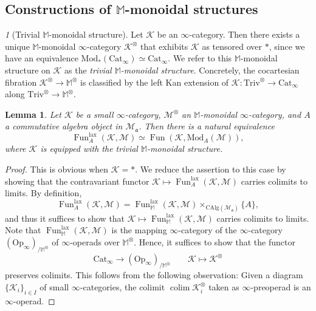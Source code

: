 \documentclass{amsart}
\theoremstyle{plain}
\newtheorem{lemma}[theorem]{Lemma}
\theoremstyle{definition}
\theoremstyle{remark}
\newtheorem{p}[theorem]{}
\numberwithin{equation}{theorem}
\newcommand{\mcal}[1]{\mathcal{#1}}
\newcommand{\mbb}[1]{\mathbb{#1}}
\newcommand{\mfk}[1]{\mathfrak{#1}}
\newcommand{\CAlg}{\mathrm{CAlg}}
\newcommand{\Cat}{\mathrm{Cat}}
\newcommand{\Mod}{\mathrm{Mod}}
\newcommand{\Op}{\mathrm{Op}}
\newcommand{\Triv}{\mathrm{Triv}}
\newcommand{\lax}{\mathrm{lax}}
\newcommand{\Fun}{\operatorname{Fun}}
\newcommand{\colim}{\operatorname*{colim}}
\begin{document}
\subsection{Constructions of $\mbb{M}$-monoidal structures}\label{CoM}

\begin{p}[Trivial $\mbb{M}$-monoidal structure]\label{p:CoM}
Let $\mcal{K}$ be an $\infty$-category.
Then there exists a unique $\mbb{M}$-monoidal $\infty$-category $\mcal{K}^\otimes$ that exhibits $\mcal{K}$ as tensored over $*$, since we have an equivalence $\Mod_*(\Cat_\infty)\simeq\Cat_\infty$.
We refer to this $\mbb{M}$-monoidal structure on $\mcal{K}$ as the \textit{trivial $\mbb{M}$-monoidal structure}.
Concretely, the cocartesian fibration $\mcal{K}^\otimes\to\mbb{M}^\otimes$ is classified by the left Kan extension of $\mcal{K}\colon\Triv^\otimes\to\Cat_\infty$ along $\Triv^\otimes\to\mbb{M}^\otimes$.
\end{p}

\begin{lemma}\label{lem:CoM}
Let $\mcal{K}$ be a small $\infty$-category, $\mcal{M}^\otimes$ an $\mbb{M}$-monoidal $\infty$-category, and $A$ a commutative algebra object in $\mcal{M}_\mfk{a}$.
Then there is a natural equivalence
\[
	\Fun^\lax_A(\mcal{K},\mcal{M}) \simeq \Fun(\mcal{K},\Mod_A(\mcal{M})),
\]
where $\mcal{K}$ is equipped with the trivial $\mbb{M}$-monoidal structure.
\end{lemma}
\begin{proof}
This is obvious when $\mcal{K}=*$.
We reduce the assertion to this case by showing that the contravariant functor $\mcal{K}\mapsto\Fun^\lax_A(\mcal{K},\mcal{M})$ carries colimits to limits.
By definition,
\[
	\Fun^\lax_A(\mcal{K},\mcal{M})=\Fun^\lax_\mbb{M}(\mcal{K},\mcal{M})\times_{\CAlg(\mcal{M}_\mfk{a})}\{A\},
\]
and thus it suffices to show that $\mcal{K}\mapsto\Fun^\lax_\mbb{M}(\mcal{K},\mcal{M})$ carries colimits to limits.
Note that $\Fun^\lax_\mbb{M}(\mcal{K},\mcal{M})$ is the mapping $\infty$-category of the $\infty$-category $(\Op_\infty)_{/\mbb{M}^\otimes}$ of $\infty$-operads over $\mbb{M}^\otimes$.
Hence, it suffices to show that the functor
\[
	\Cat_\infty \to (\Op_\infty)_{/\mbb{M}^\otimes} \qquad \mcal{K}\mapsto\mcal{K}^\otimes
\]
preserves colimits.
This follows from the following observation: Given a diagram $\{\mcal{K}_i\}_{i\in I}$ of small $\infty$-categories, the colimit $\colim\mcal{K}_i^\otimes$ taken as $\infty$-preoperad is an $\infty$-operad.
\end{proof}
\end{document}
